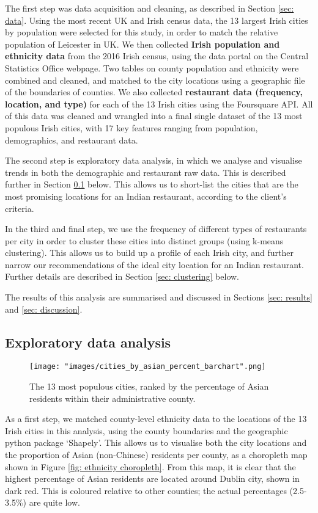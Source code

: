 \documentclass[a4paper,11pt]{article}
\begin{document}
The first step was data acquisition and cleaning, as described in Section \ref{sec: data}. Using the most recent UK and Irish census data, the 13 largest Irish cities by population were selected for this study, in order to match the relative population of Leicester in UK. We then collected \textbf{Irish population and ethnicity data} from the 2016 Irish census, using the data portal on the Central Statistics Office webpage. Two tables on county population and ethnicity were combined and cleaned, and matched to the city locations using a geographic file of the boundaries of counties. We also collected \textbf{restaurant data (frequency, location, and type)} for each of the 13 Irish cities using the Foursquare API. All of this data was cleaned and wrangled into a final single dataset of the 13 most populous Irish cities, with 17 key features ranging from population, demographics, and restaurant data.

The second step is exploratory data analysis, in which we analyse and visualise trends in both the demographic and restaurant raw data. This is described further in Section \ref{sec: EDA} below. This allows us to short-list the cities that are the most promising locations for an Indian restaurant, according to the client's criteria.

In the third and final step, we use the frequency of different types of restaurants per city in order to cluster these cities into distinct groups (using k-means clustering). This allows us to build up a profile of each Irish city, and further narrow our recommendations of the ideal city location for an Indian restaurant. Further details are described in Section \ref{sec: clustering} below.

The results of this analysis are summarised and discussed in Sections \ref{sec: results} and \ref{sec: discussion}.

\subsection{Exploratory data analysis}\label{sec: EDA}
%
\begin{figure}[htb]
   \centering
   \texttt{[image: "images/cities\_by\_asian\_percent\_barchart".png]}
      \caption{The 13 most populous cities, ranked by the percentage of Asian residents within their administrative county.}
      \label{fig:city by ethnicity}
\end{figure}
%
As a first step, we matched county-level ethnicity data to the locations of the 13 Irish cities in this analysis, using the county boundaries and the geographic python package `Shapely'. This allows us to visualise both the city locations and the proportion of Asian (non-Chinese) residents per county, as a choropleth map shown in Figure \ref{fig: ethnicity choropleth}. From this map, it is clear that the highest percentage of Asian residents are located around Dublin city, shown in dark red. This is coloured relative to other counties; the actual percentages (2.5-3.5\%) are quite low. 
\end{document}
